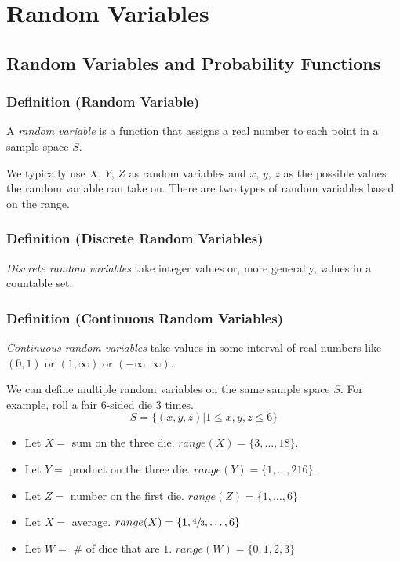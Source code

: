 \chapter{Random Variables}

\section{Random Variables and Probability Functions}
\begin{defbox}
    \subsection{Definition (Random Variable)}
    A \emph{random variable} is a function that assigns a real number to each point in
    a sample space $S$.
\end{defbox}
We typically use $ X,\,Y,\,Z $ as random variables and $ x,\,y,\,z $ as the
possible values the random variable can take on. There are two types
of random variables based on the range.
\begin{defbox}
    \subsection{Definition (Discrete Random Variables)}
    \emph{Discrete random variables} take integer values or, more generally, values in a
    countable set.
\end{defbox}
\begin{defbox}
    \subsection{Definition (Continuous Random Variables)}
    \emph{Continuous random variables} take values in some interval of real numbers
    like $(0,1)$ or $(1,\infty)$ or $ (-\infty,\infty) $.
\end{defbox}
We can define multiple random variables on the same sample space $ S $. For example,
roll a fair $ 6 $-sided die $ 3 $ times.
\[ S=\{(x,y,z)|1\le x, y, z\le 6\} \]

\begin{itemize}
    \item Let $ X= $ sum on the three die. $range(X) =\{3,\ldots ,18\} $.
    \item Let $ Y= $ product on the three die. $range(Y) =\{1,\ldots ,216\} $.
    \item Let $ Z= $ number on the first die. $range(Z) =\{1,\ldots ,6\} $
    \item Let $ \bar{X}= $ average. $range(\bar{X}) =\{1,\sfrac{4}{3},\ldots ,6\} $
    \item Let $ W= $ \# of dice that are $ 1 $. $range(W)= \{0,1,2,3\} $
\end{itemize}

